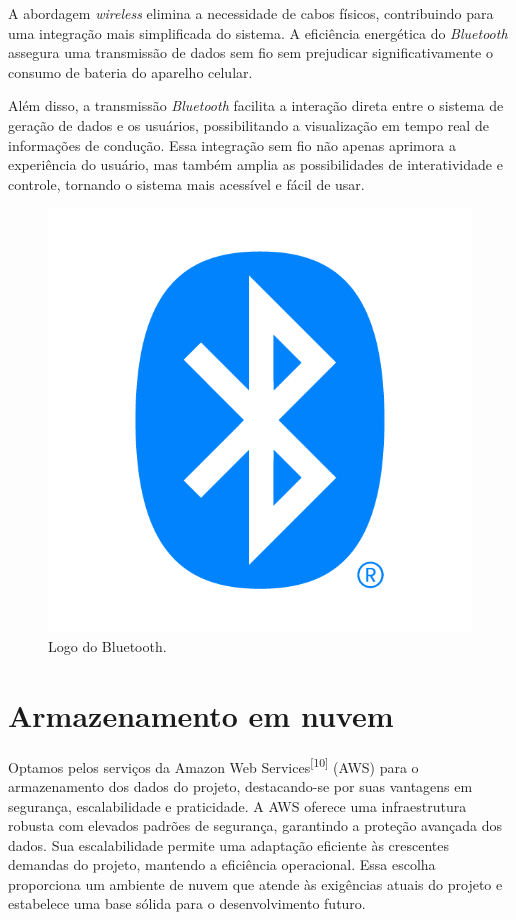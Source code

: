 A abordagem \textit{wireless} elimina a necessidade de cabos físicos, contribuindo para uma integração mais simplificada do sistema. A eficiência energética do \textit{Bluetooth} assegura uma transmissão de dados sem fio sem prejudicar significativamente o consumo de bateria do aparelho celular.

Além disso, a transmissão \textit{Bluetooth} facilita a interação direta entre o sistema de geração de dados e os usuários, possibilitando a visualização em tempo real de informações de condução. Essa integração sem fio não apenas aprimora a experiência do usuário, mas também amplia as possibilidades de interatividade e controle, tornando o sistema mais acessível e fácil de usar.


 \begin{figure}[hp]
    \centering
    
    \includegraphics[scale=0.4]{figures/bluetooth.png}
    
    \caption{Logo do Bluetooth.}
    
\end{figure}

\section{Armazenamento em nuvem}
Optamos pelos serviços da Amazon Web Services\textsuperscript{[10]} (AWS) para o armazenamento dos dados do projeto, destacando-se por suas vantagens em segurança, escalabilidade e praticidade. A AWS oferece uma infraestrutura robusta com elevados padrões de segurança, garantindo a proteção avançada dos dados. Sua escalabilidade permite uma adaptação eficiente às crescentes demandas do projeto, mantendo a eficiência operacional. Essa escolha proporciona um ambiente de nuvem que atende às exigências atuais do projeto e estabelece uma base sólida para o desenvolvimento futuro.



